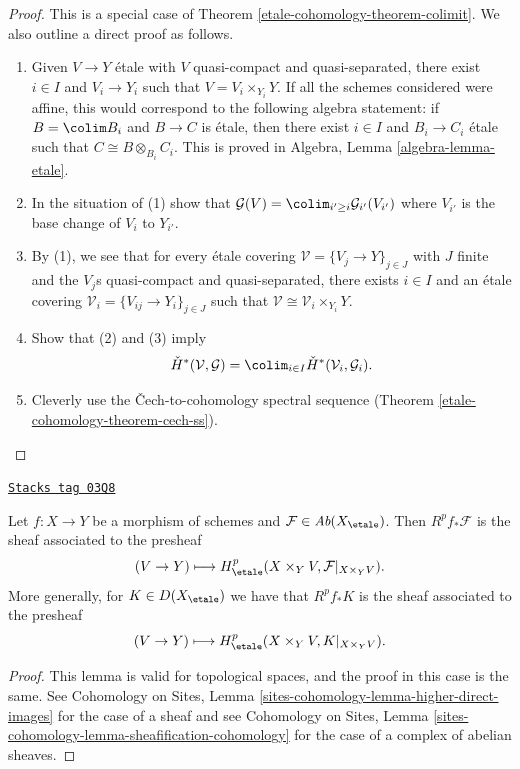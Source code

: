 \begin{proof}
This is a special case of Theorem \ref{etale-cohomology-theorem-colimit}.
We also outline a direct proof as follows.
\begin{enumerate}
\item Given $V \to Y$ \'etale with $V$ quasi-compact and
quasi-separated, there exist $i\in I$ and $V_i \to Y_i$ such that
$V = V_i \times_{Y_i} Y$.
If all the schemes considered were affine, this would correspond to the
following algebra statement: if $B = \colim B_i$ and $B \to C$ is \'etale,
then there exist $i \in I$ and $B_i \to C_i$ \'etale such that
$C \cong B \otimes_{B_i} C_i$.
This is proved in Algebra, Lemma \ref{algebra-lemma-etale}.
\item In the situation of (1) show that
$\mathcal{G}(V) = \colim_{i' \geq i} \mathcal{G}_{i'}(V_{i'})$
where $V_{i'}$ is the base change of $V_i$ to $Y_{i'}$.
\item By (1), we see that for every \'etale covering
$\mathcal{V} = \{V_j \to Y\}_{j\in J}$ with $J$ finite and the
$V_j$s quasi-compact and quasi-separated, there exists $i \in I$ and
an \'etale covering $\mathcal{V}_i = \{V_{ij} \to Y_i\}_{j \in J}$
such that $\mathcal{V} \cong \mathcal{V}_i \times_{Y_i} Y$.
\item Show that (2) and (3) imply
$$
\check H^*(\mathcal{V}, \mathcal{G})=
\colim_{i\in I} \check H^*(\mathcal{V}_i, \mathcal{G}_i).
$$
\item Cleverly use the {\v C}ech-to-cohomology spectral sequence
(Theorem \ref{etale-cohomology-theorem-cech-ss}).
\end{enumerate}
\end{proof}

\begin{lemma}
\label{etale-cohomology-lemma-higher-direct-images}
\href{https://stacks.math.columbia.edu/tag/03Q8}{\texttt{Stacks tag 03Q8}}

Let $f: X\to Y$ be a morphism of schemes and $\mathcal{F}\in
\textit{Ab}(X_\etale)$. Then $R^pf_*\mathcal{F}$ is the sheaf
associated to the presheaf
$$
(V \to Y) \longmapsto H_\etale^p(X \times_Y V, \mathcal{F}|_{X \times_Y V}).
$$
More generally, for $K \in D(X_\etale)$ we have that $R^pf_*K$ is the
sheaf associated to the presheaf
$$
(V \to Y) \longmapsto H_\etale^p(X \times_Y V, K|_{X \times_Y V}).
$$
\end{lemma}

\begin{proof}
This lemma is valid for topological spaces, and the proof in this case is the
same. See Cohomology on Sites, Lemma
\ref{sites-cohomology-lemma-higher-direct-images}
for the case of a sheaf and see
Cohomology on Sites, Lemma
\ref{sites-cohomology-lemma-sheafification-cohomology}
for the case of a complex of abelian sheaves.
\end{proof}

